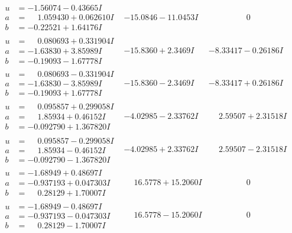 \documentclass[1p]{elsarticle_modified}
\theoremstyle{definition}
\begin{document}
$$\begin{array}{c|c|c}
\begin{aligned}
u &= -1.56074 - 0.43665 I \\
a &= \phantom{-}1.059430 + 0.062610 I \\
b &= -0.22521 + 1.64176 I\end{aligned}
 & -15.0846 - 11.0453 I & \phantom{-0.000000 } 0 \\ \hline\begin{aligned}
u &= \phantom{-}0.080693 + 0.331904 I \\
a &= -1.63830 + 3.85989 I \\
b &= -0.19093 - 1.67778 I\end{aligned}
 & -15.8360 + 2.3469 I & -8.33417 - 0.26186 I \\ \hline\begin{aligned}
u &= \phantom{-}0.080693 - 0.331904 I \\
a &= -1.63830 - 3.85989 I \\
b &= -0.19093 + 1.67778 I\end{aligned}
 & -15.8360 - 2.3469 I & -8.33417 + 0.26186 I \\ \hline\begin{aligned}
u &= \phantom{-}0.095857 + 0.299058 I \\
a &= \phantom{-}1.85934 + 0.46152 I \\
b &= -0.092790 + 1.367820 I\end{aligned}
 & -4.02985 - 2.33762 I & \phantom{-}2.59507 + 2.31518 I \\ \hline\begin{aligned}
u &= \phantom{-}0.095857 - 0.299058 I \\
a &= \phantom{-}1.85934 - 0.46152 I \\
b &= -0.092790 - 1.367820 I\end{aligned}
 & -4.02985 + 2.33762 I & \phantom{-}2.59507 - 2.31518 I \\ \hline\begin{aligned}
u &= -1.68949 + 0.48697 I \\
a &= -0.937193 + 0.047303 I \\
b &= \phantom{-}0.28129 + 1.70007 I\end{aligned}
 & \phantom{-}16.5778 + 15.2060 I & \phantom{-0.000000 } 0 \\ \hline\begin{aligned}
u &= -1.68949 - 0.48697 I \\
a &= -0.937193 - 0.047303 I \\
b &= \phantom{-}0.28129 - 1.70007 I\end{aligned}
 & \phantom{-}16.5778 - 15.2060 I & \phantom{-0.000000 } 0\\

\end{array}$$
\end{document}

